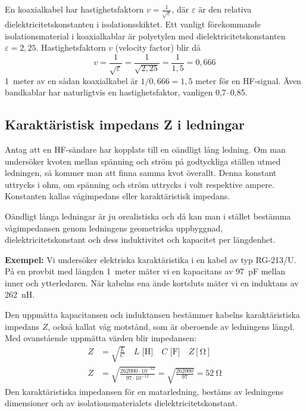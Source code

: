 En koaxialkabel har hastighetsfaktorn \(v = \frac{1}{\sqrt{\varepsilon}}\),
där \(\varepsilon\) är den relativa dielektricitetskonstanten i
isolationsskiktet.
Ett vanligt förekommande isolationsmaterial i koaxialkablar är polyetylen med
dielektricitetskonstanten \(\varepsilon = 2,25\).
Hastighetsfaktorn \(v\) (velocity factor) blir då
\[
v = \frac{1}{\sqrt{\varepsilon}} = \frac{1}{\sqrt{2,25}} = \frac{1}{1,5} = 0,666
\]
1~meter av en sådan koaxialkabel är \(1/0,666 = 1,5\) meter för en HF-signal.
Även bandkablar har naturligtvis en hastighetsfaktor, vanligen 0,7--0,85.


\subsection{Karaktäristisk impedans Z i led\-ningar}

Antag att en HF-sändare har kopplats till en oändligt lång ledning.
Om man undersöker kvoten mellan spänning och ström på godtyckliga ställen
utmed ledningen, så kommer man att finna samma kvot överallt.
Denna konstant uttrycks i ohm, om spänning och ström uttrycks i volt
respektive ampere.
Konstanten kallas vågimpedans eller karaktäristisk impedans.

Oändligt långa ledningar är ju orealistiska och då kan man i stället bestämma
vågimpedansen genom ledningens geometriska uppbyggnad, dielektricitetskonstant
och dess induktivitet och kapacitet per längdenhet.

\noindent\textbf{Exempel:}
Vi undersöker elektriska karaktäristika i en kabel av typ RG-213/U.
På en provbit med längden 1~meter mäter vi en kapacitans av \qty{97}{\pico\farad}
mellan inner och ytterledaren.
När kabelns ena ände kortsluts mäter vi en induktans av \qty{262}{\nano\henry}.

Den uppmätta kapacitansen och induktansen bestämmer kabelns karaktäristiska
impedans \(Z\), också kallat våg motstånd, som är oberoende av ledningens längd.
Med ovanstående uppmätta värden blir impedansen:
\begin{align*}
  Z &= \sqrt{\frac{L}{C}} \quad L\text{ [H]} \quad C\text{ [F]} \quad
  Z [\unit{\ohm}] \\
  Z &= \sqrt{\frac{262000\cdot 10^{-12}}{97\cdot 10^{-12}}} =
  \sqrt{\frac{262000}{97}} = \qty{52}{\ohm}
\end{align*}
Den karaktäristiska impedansen för en matarledning, bestäms av ledningens
dimensioner och av isolationsmaterialets dielektricitetskonstant.

